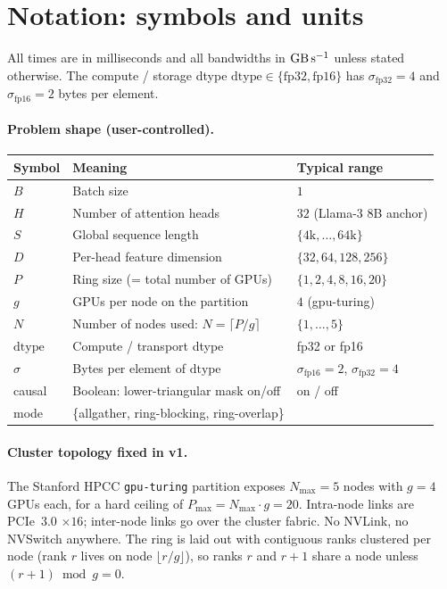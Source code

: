 \documentclass[11pt]{article}
\newcommand{\dtype}{\mathrm{dtype}}
\newcommand{\Bd}{\sigma}        %
\begin{document}
\section{Notation: symbols and units}
\label{sec:symbols}

All times are in milliseconds and all bandwidths in
$\si{\giga\byte\per\second}$ unless stated otherwise. The compute /
storage dtype $\dtype \in \{\text{fp32}, \text{fp16}\}$ has
$\Bd_{\text{fp32}} = 4$ and $\Bd_{\text{fp16}} = 2$ bytes per element.

\paragraph{Problem shape (user-controlled).}
\begin{longtable}{@{}lll@{}}
  \toprule
  Symbol & Meaning & Typical range \\
  \midrule
  $B$        & Batch size                               & $1$ \\
  $H$        & Number of attention heads                & $32$ (Llama-3 8B anchor) \\
  $S$        & Global sequence length                   & $\{4\mathrm{k},\dots,64\mathrm{k}\}$ \\
  $D$        & Per-head feature dimension               & $\{32,64,128,256\}$ \\
  $P$        & Ring size (= total number of GPUs)       & $\{1,2,4,8,16,20\}$ \\
  $g$        & GPUs per node on the partition           & $4$ (gpu-turing) \\
  $N$        & Number of nodes used: $N = \lceil P / g\rceil$ & $\{1,\dots,5\}$ \\
  $\dtype$   & Compute / transport dtype                & fp32 or fp16 \\
  $\Bd$      & Bytes per element of $\dtype$            & $\Bd_{\text{fp16}}=2$, $\Bd_{\text{fp32}}=4$ \\
  causal     & Boolean: lower-triangular mask on/off    & on / off \\
  mode       & \{allgather, ring-blocking, ring-overlap\} & \\
  \bottomrule
\end{longtable}

\paragraph{Cluster topology fixed in v1.}
The Stanford HPCC \texttt{gpu-turing} partition exposes
$N_\text{max} = 5$ nodes with $g = 4$ GPUs each, for a hard ceiling of
$P_\text{max} = N_\text{max}\cdot g = 20$. Intra-node links are PCIe~3.0
$\times 16$; inter-node links go over the cluster fabric. No NVLink,
no NVSwitch anywhere. The ring is laid out with contiguous ranks
clustered per node (rank $r$ lives on node $\lfloor r/g \rfloor$), so
ranks $r$ and $r+1$ share a node unless $(r+1) \bmod g = 0$.
\end{document}
